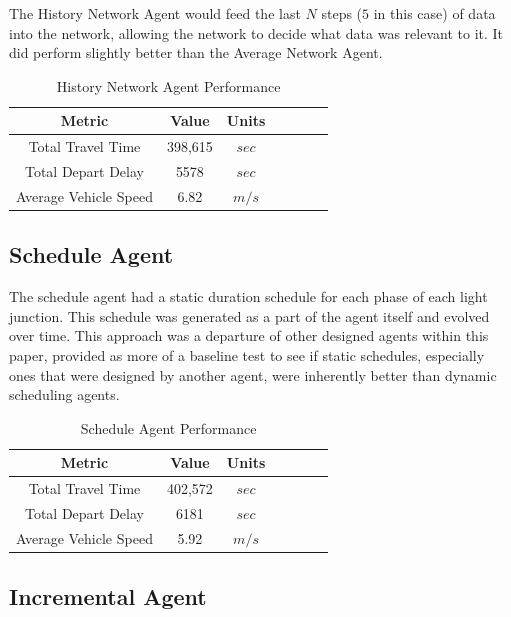 \documentclass[twocolumn]{article}
\begin{document}
The History Network Agent would feed the last $N$ steps ($5$ in this case) of data into the network, allowing the network to decide what data was relevant to it. It did perform slightly better than the Average Network Agent.

\begin{table}[H]
    \centering
    \begin{tabular}{|c|c|c|c|c|c|c|}
        \hline
         Metric & Value & Units \\
        \hline\hline
        Total Travel Time & 398,615 & $sec$ \\
        \hline
        Total Depart Delay & 5578 & $sec$ \\
        \hline
        Average Vehicle Speed & 6.82 & $m/s$ \\
        \hline
    \end{tabular}
    \caption{History Network Agent Performance}
    \label{tab:history_agent_perf}
\end{table}

\subsection{Schedule Agent}

The schedule agent had a static duration schedule for each phase of each light junction. This schedule was generated as a part of the agent itself and evolved over time. This approach was a departure of other designed agents within this paper, provided as more of a baseline test to see if static schedules, especially ones that were designed by another agent, were inherently better than dynamic scheduling agents.

\begin{table}[H]
    \centering
    \begin{tabular}{|c|c|c|c|c|c|c|}
        \hline
         Metric & Value & Units \\
        \hline\hline
        Total Travel Time & 402,572 & $sec$ \\
        \hline
        Total Depart Delay & 6181 & $sec$ \\
        \hline
        Average Vehicle Speed & 5.92 & $m/s$ \\
        \hline
    \end{tabular}
    \caption{Schedule Agent Performance}
    \label{tab:scheduled_agent_perf}
\end{table}

\subsection{Incremental Agent}
\end{document}
